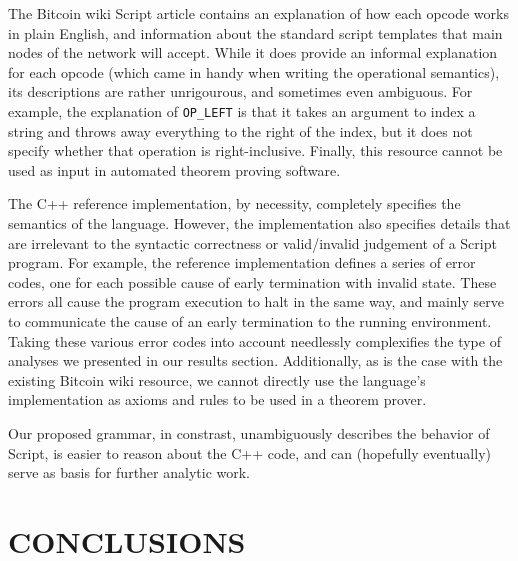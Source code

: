 \documentclass[letterpaper, 10 pt, conference]{ieeeconf}
\begin{document}
The Bitcoin wiki Script article contains an explanation of how each opcode works in plain English, and information about the standard script templates that main nodes of the network will accept. While it does provide an informal explanation for each opcode (which came in handy when writing the operational semantics), its descriptions are rather unrigourous, and sometimes even ambiguous. For example, the explanation of \texttt{OP\_LEFT} is that it takes an argument to index a string and throws away everything to the right of the index, but it does not specify whether that operation is right-inclusive. Finally, this resource cannot be used as input in automated theorem proving software. 

The C++ reference implementation, by necessity, completely specifies the semantics of the language. However, the implementation also specifies details that are irrelevant to the syntactic correctness or valid/invalid judgement of a Script program. For example, the reference implementation defines a series of error codes, one for each possible cause of early termination with invalid state. These errors all cause the program execution to halt in the same way, and mainly serve to communicate the cause of an early termination to the running environment. Taking these various error codes into account needlessly complexifies the type of analyses we presented in our results section. Additionally, as is the case with the existing Bitcoin wiki resource, we cannot directly use the language's implementation as axioms and rules to be used in a theorem prover.

Our proposed grammar, in constrast, unambiguously describes the behavior of Script, is easier to reason about the C++ code, and can (hopefully eventually) serve as basis for further analytic work.


\section{CONCLUSIONS}

\addtolength{\textheight}{-12cm}   %
\end{document}
